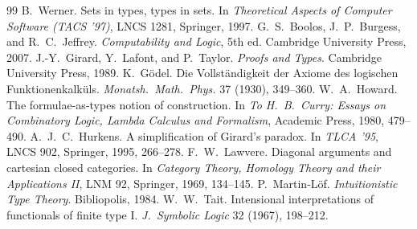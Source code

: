 \documentclass[11pt]{article}
\theoremstyle{definition}
\theoremstyle{plain}
\theoremstyle{remark}
\begin{document}
\begin{thebibliography}{99}
 B.~Werner. Sets in types, types in sets. In \emph{Theoretical Aspects of Computer Software (TACS '97)}, LNCS 1281, Springer, 1997.
 G.~S.~Boolos, J.~P.~Burgess, and R.~C.~Jeffrey. \emph{Computability and Logic}, 5th ed. Cambridge University Press, 2007.
 J.-Y.~Girard, Y.~Lafont, and P.~Taylor. \emph{Proofs and Types}. Cambridge University Press, 1989.
 K.~G\"odel. Die Vollst\"andigkeit der Axiome des logischen Funktionenkalk\"uls. \emph{Monatsh.\ Math.\ Phys.} 37 (1930), 349--360.
 W.~A.~Howard. The formulae-as-types notion of construction. In \emph{To H.~B.~Curry: Essays on Combinatory Logic, Lambda Calculus and Formalism}, Academic Press, 1980, 479--490.
 A.~J.~C.~Hurkens. A simplification of Girard's paradox. In \emph{TLCA '95}, LNCS 902, Springer, 1995, 266--278.
 F.~W.~Lawvere. Diagonal arguments and cartesian closed categories. In \emph{Category Theory, Homology Theory and their Applications II}, LNM 92, Springer, 1969, 134--145.
 P.~Martin-L\"of. \emph{Intuitionistic Type Theory}. Bibliopolis, 1984.
 W.~W.~Tait. Intensional interpretations of functionals of finite type I. \emph{J.\ Symbolic Logic} 32 (1967), 198--212.
\end{thebibliography}
\end{document}
